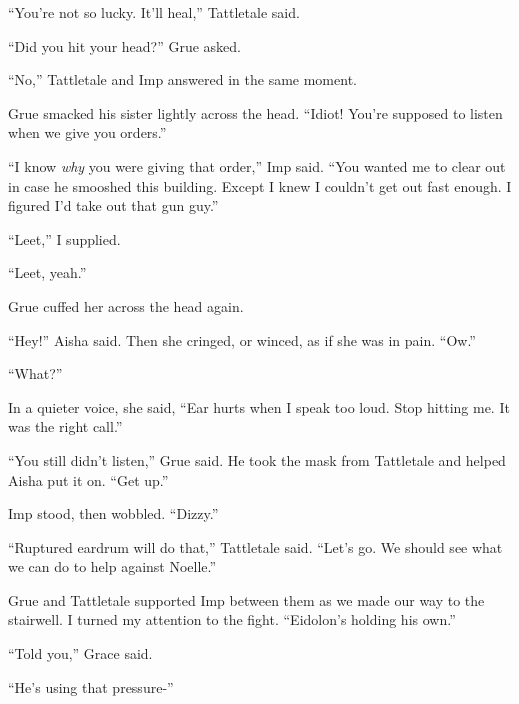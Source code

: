 ``You're not so lucky.  It'll heal,'' Tattletale said.



``Did you hit your head?'' Grue asked.



``No,'' Tattletale and Imp answered in the same moment.



Grue smacked his sister lightly across the head.  ``Idiot!  You're supposed to listen when we give you orders.''



``I know \emph{why} you were giving that order,'' Imp said.  ``You wanted me to clear out in case he smooshed this building.  Except I knew I couldn't get out fast enough.  I figured I'd take out that gun guy.''



``Leet,'' I supplied.



``Leet, yeah.''



Grue cuffed her across the head again.



``Hey!'' Aisha said.  Then she cringed, or winced, as if she was in pain.  ``Ow.''



``What?''



In a quieter voice, she said, ``Ear hurts when I speak too loud.  Stop hitting me.  It was the right call.''



``You still didn't listen,'' Grue said.  He took the mask from Tattletale and helped Aisha put it on.  ``Get up.''



Imp stood, then wobbled.  ``Dizzy.''



``Ruptured eardrum will do that,'' Tattletale said.  ``Let's go.  We should see what we can do to help against Noelle.''



Grue and Tattletale supported Imp between them as we made our way to the stairwell.  I turned my attention to the fight.  ``Eidolon's holding his own.''



``Told you,'' Grace said.



``He's using that pressure-''



